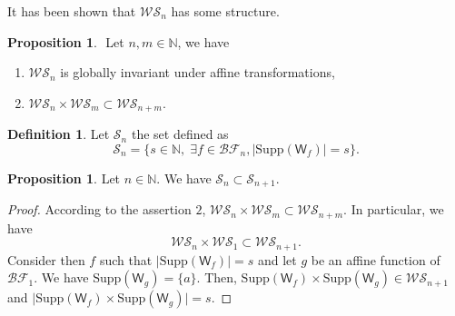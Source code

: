 \documentclass[12pt]{article}
\theoremstyle{definition}
\newtheorem{definition}[theorem]{Definition}
\newtheorem{proposition}[theorem]{Proposition}
\newcommand{\WS}{\mathcal{WS}}
\newcommand{\N}{\mathbb{N}}
\newcommand{\W}{\mathsf{W}}
\begin{document}
It has been shown that \(\mathcal{WS}_n\) has some structure.
\begin{proposition} \(\label{wsproperty}\) Let \(n,m\in\N\), we have 
    \begin{enumerate}
        \item \(\WS_n\) is globally invariant under affine transformations,
        \item \(\WS_n\times \WS_m \subset \WS_{n+m}\).
    \end{enumerate}
\end{proposition}
\begin{definition} Let \(\mathcal{S}_{n}\) the set defined as 
    \[\mathcal{S}_{n} =\{s\in \N,\; \exists f \in \mathcal{BF}_n, \lvert\mathrm{Supp}(\W_f)\rvert = s\}.\]
\end{definition}
\begin{proposition} Let \(n\in \N\). We have \(\mathcal{S}_n\subset \mathcal{S}_{n+1}\).
\end{proposition}
\begin{proof}
    According to the assertion \(2\), \(\WS_n\times \WS_m \subset \WS_{n+m}\). In particular, we have 
    \begin{equation*}
        \WS_n\times \WS_1 \subset \WS_{n+1}.
    \end{equation*}
    Consider then \(f\) such that \(\lvert\mathrm{Supp}(\W_f)\rvert = s\) and let \(g\) be an affine function of \(\mathcal{BF}_1\). 
    We have \(\mathrm{Supp}(\W_g) = \{a\}\). Then, \(\mathrm{Supp}(\W_f)\times \mathrm{Supp}(\W_g)\in \WS_{n+1}\) and 
    \(\lvert\mathrm{Supp}(\W_f)\times \mathrm{Supp}(\W_g)\rvert = s\).
\end{proof}
\end{document}
